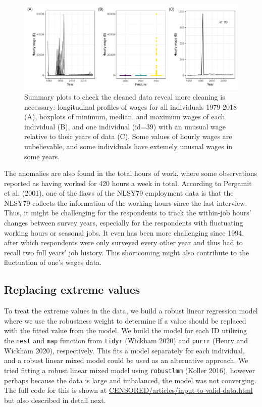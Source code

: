 \documentclass{article}
\begin{document}
\begin{figure}

{\centering \includegraphics[width=1\linewidth]{figures/feature-plot-1} 

}

\caption{Summary plots to check the cleaned data reveal more cleaning is necessary: longitudinal profiles of wages for all individuals 1979-2018 (A), boxplots of minimum, median, and maximum wages of each individual (B), and one individual (id=39) with an unusual wage relative to their years of data (C). Some values of hourly wages are unbelievable, and some individuals have extemely unusual wages in some years.}\label{fig:feature-plot}
\end{figure}

The anomalies are also found in the total hours of work, where some observations reported as having worked for 420 hours a week in total. According to Pergamit et al. (2001), one of the flaws of the NLSY79 employment data is that the NLSY79 collects the information of the working hours since the last interview. Thus, it might be challenging for the respondents to track the within-job hours' changes between survey years, especially for the respondents with fluctuating working hours or seasonal jobs. It even has been more challenging since 1994, after which respondents were only surveyed every other year and thus had to recall two full years' job history. This shortcoming might also contribute to the fluctuation of one's wages data.

\hypertarget{censor}{%
\subsection{Replacing extreme values}\label{censor}}

To treat the extreme values in the data, we build a robust linear regression model where we use the robustness weight to determine if a value should be replaced with the fitted value from the model. We build the model for each ID utilizing the \texttt{nest} and \texttt{map} function from \texttt{tidyr} (Wickham 2020) and \texttt{purrr} (Henry and Wickham 2020), respectively. This fits a model separately for each individual, and a robust linear mixed model could be used as an alternative approach. We tried fitting a robust linear mixed model using \texttt{robustlmm} (Koller 2016), however perhaps because the data is large and imbalanced, the model was not converging. The full code for this is shown at \url{CENSORED/articles/input-to-valid-data.html} but also described in detail next.
\end{document}
